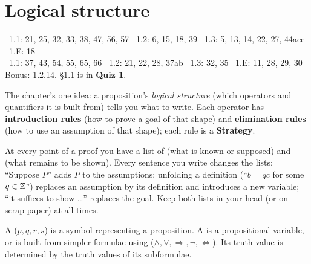\chapter{Logical structure}
%
{\fE\ 1.1: 21, 25, 32, 33, 38, 47, 56, 57 \textperiodcentered\ 1.2: 6, 15, 18, 39 \textperiodcentered\ 1.3: 5, 13, 14, 22, 27, 44ace \textperiodcentered\ 1.E: 18\\ \fR\ 1.1: 37, 43, 54, 55, 65, 66 \textperiodcentered\ 1.2: 21, 22, 28, 37ab \textperiodcentered\ 1.3: 32, 35 \textperiodcentered\ 1.E: 11, 28, 29, 30\\ Bonus: 1.2.14. \S1.1 is in \textbf{Quiz 1}.}

The chapter's one idea: a proposition's \emph{logical structure} (which operators and quantifiers it is built from) tells you what to write. Each operator has \textbf{introduction rules} (how to prove a goal of that shape) and \textbf{elimination rules} (how to use an assumption of that shape); each rule is a \textbf{Strategy}.


\begin{key}
At every point of a proof you have a list of  (what is known or supposed) and  (what remains to be shown). Every sentence you write changes the lists: ``Suppose $P$'' adds $P$ to the assumptions; unfolding a definition (``$b=qc$ for some $q\in\mathbb{Z}$'') replaces an assumption by its definition and introduces a new variable; ``it suffices to show \dots'' replaces the goal. Keep both lists in your head (or on scrap paper) at all times.
\end{key}

\begin{key}[{Definitions 1.1.2--1.1.3}]
A  ($p,q,r,s$) is a symbol representing a proposition. A  is a propositional variable, or is built from simpler formulae using  ($\wedge,\vee,\Rightarrow,\neg,\Leftrightarrow$). Its truth value is determined by the truth values of its subformulae.
\end{key}

